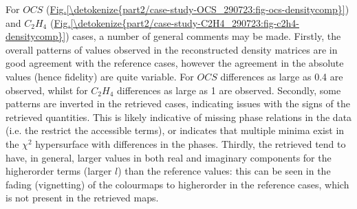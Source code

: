 \documentclass[letterpaper,table,10pt,english]{jupyterBook}
\begin{document}
\sphinxAtStartPar
For \(OCS\) (\hyperref[\detokenize{part2/case-study-OCS_290723:fig-ocs-densitycomp}]{Fig.\@ \ref{\detokenize{part2/case-study-OCS_290723:fig-ocs-densitycomp}}}) and \(C_2H_4\) (\hyperref[\detokenize{part2/case-study-C2H4_290723:fig-c2h4-densitycomp}]{Fig.\@ \ref{\detokenize{part2/case-study-C2H4_290723:fig-c2h4-densitycomp}}}) cases, a number of general comments may be made. Firstly, the overall patterns of values observed in the reconstructed density matrices are in good agreement with the reference cases, however the agreement in the absolute values (hence fidelity) are quite variable. For \(OCS\) differences as large as 0.4 are observed, whilst for \(C_2H_4\) differences as large as 1 are observed. Secondly, some patterns are inverted in the retrieved cases, indicating issues with the signs of the retrieved quantities. This is likely indicative of missing phase relations in the data (i.e. the {\hyperref[\detokenize{backmatter/glossary:term-channel-functions}]{}} restrict the accessible terms), or indicates that multiple minima exist in the \(\chi^2\) hypersurface with differences in the phases. Thirdly, the retrieved {\hyperref[\detokenize{backmatter/glossary:term-radial-matrix-elements}]{}} tend to have, in general, larger values in both real and imaginary components for the higher\sphinxhyphen{}order terms (larger \(l\)) than the reference values: this can be seen in the fading (vignetting) of the colourmaps to higher\sphinxhyphen{}order in the reference cases, which is not present in the retrieved maps.
\end{document}
